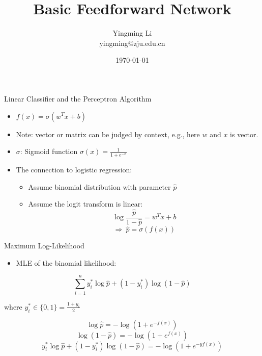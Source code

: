 \documentclass[12pt,notes,mathserif]{beamer}
\title{Basic Feedforward Network}
\author[YingmingLi]{Yingming Li \\ yingming@zju.edu.cn}
\institute[DSERC, ZJU]{Data Science \& Engineering Research Center, ZJU}
\date[\today]{\today}
\providecommand{\tightlist}{%
	\setlength{\itemsep}{0pt}\setlength{\parskip}{0pt}}
\begin{document}

\begin{frame}[c]
	\titlepage
\end{frame}

\section{}\label{section}

\begin{frame}{Linear Classifier and the Perceptron Algorithm}

\begin{itemize}
\item
  \(f(x)=\sigma(w^T{x}+b)\)
\item
  Note: vector or matrix can be judged by context, e.g., here \(w\) and
  \(x\) is vector.
\item
  \(\sigma\): Sigmoid function \(\sigma(x)=\frac{1}{1+e^{-x}}\)
\item
  The connection to logistic regression:

  \begin{itemize}
  \tightlist
  \item
    Assume binomial distribution with parameter \(\hat{p}\)
  \item
    Assume the logit transform is linear:
    \[\log\frac{\hat{p}}{1-\hat{p}}=w^{{T}}x+b\]
    \[\Rightarrow\ \hat{p}=\sigma(f(x))\]
  \end{itemize}
\end{itemize}

\end{frame}

\begin{frame}{Maximum Log-Likelihood}

\begin{itemize}
\tightlist
\item
  MLE of the binomial likelihood:
\end{itemize}

\[\sum_{i=1} ^{n} y_i^* \log \hat{p} + (1-{y}_{i}^{*})\log(1-\hat{p})\]

where \({y}_{i}^{*}\in \{0,1\} =\frac{1+y_{i}}{2}\)

\[\log\hat{p}=-\log(1+e^{-f(x)})\] \[\log(1-\hat{p})=-\log(1+e^{f(x)})\]
\[{y}_{{i}}^{*}\log\hat{p}+(1-{y}_{i}^{*})\log(1-\hat{p})=-\log(1+e^{-yf(x)})\]

\end{frame}
\end{document}
